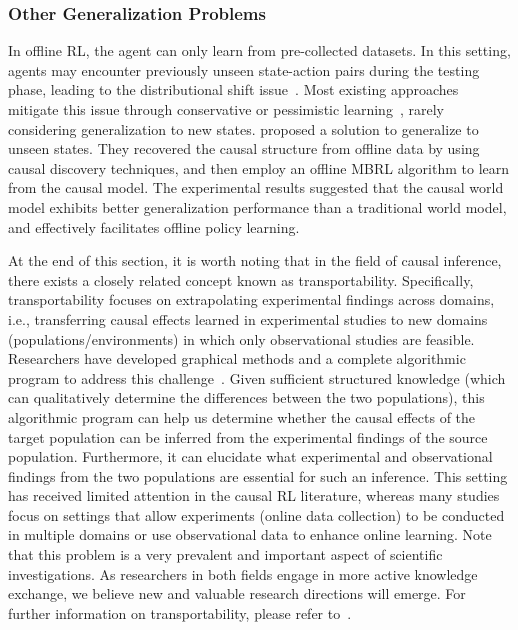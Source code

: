 \documentclass[10pt]{article} %
\theoremstyle{definition}
\begin{document}
\subsubsection{Other Generalization Problems}
In offline RL, the agent can only learn from pre-collected datasets. In this setting, agents may encounter previously unseen state-action pairs during the testing phase, leading to the distributional shift issue~\citep{levineOfflineReinforcementLearning2020b}. Most existing approaches mitigate this issue through conservative or pessimistic learning~\citep{fujimotoOffpolicyDeepReinforcement2019,kumarConservativeQlearningOffline2020a,yangParetoPolicyPool2021}, rarely considering generalization to new states. \citet{zhuOfflineReinforcementLearning2022a} proposed a solution to generalize to unseen states. They recovered the causal structure from offline data by using causal discovery techniques, and then employ an offline MBRL algorithm to learn from the causal model. The experimental results suggested that the causal world model exhibits better generalization performance than a traditional world model, and effectively facilitates offline policy learning.

At the end of this section, it is worth noting that in the field of causal inference, there exists a closely related concept known as transportability. 
Specifically, transportability focuses on extrapolating experimental findings across domains, i.e., transferring causal effects learned in experimental studies to new domains (populations/environments) in which only observational studies are feasible. 
Researchers have developed graphical methods and a complete algorithmic program to address this challenge~\citep{pearlExternalValidityDoCalculus2014}. 
Given sufficient structured knowledge (which can qualitatively determine the differences between the two populations), this algorithmic program can help us determine whether the causal effects of the target population can be inferred from the experimental findings of the source population. Furthermore, it can elucidate what experimental and observational findings from the two populations are essential for such an inference. 
This setting has received limited attention in the causal RL literature, whereas many studies focus on settings that allow experiments (online data collection) to be conducted in multiple domains or use observational data to enhance online learning. 
Note that this problem is a very prevalent and important aspect of scientific investigations. As researchers in both fields engage in more active knowledge exchange,  we believe new and valuable research directions will emerge. 
For further information on transportability, please refer to~\citet{pearlExternalValidityDoCalculus2014,bareinboimCausalInferenceDatafusion2016a}.
\end{document}
